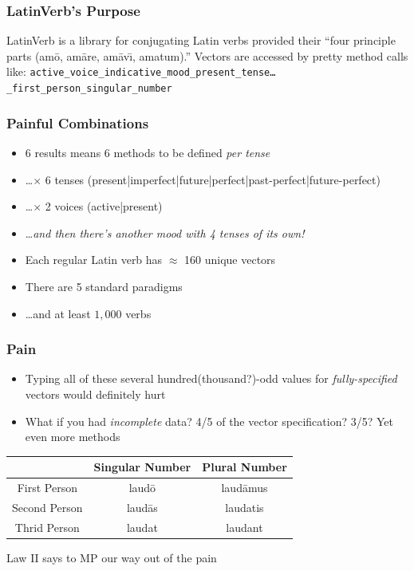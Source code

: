 \documentclass[slidestop,compress,mathserif]{beamer}
\begin{document}
\begin{frame}
	\frametitle{LatinVerb's Purpose}
	LatinVerb is a library for conjugating Latin verbs provided their ``four principle parts (am\={o}, am\={a}re, am\={a}v\={\i}, amatum).''
	\pause
	\vskip 0.5cm
	Vectors are accessed by pretty method calls like: \texttt{active\_voice\_indicative\_mood\_present\_tense{\ldots}\\\_first\_person\_singular\_number}
\end{frame}

\begin{frame}
	\frametitle{Painful Combinations}
	\begin{itemize}
		\item 6 results means 6 methods to be defined \emph{per tense}
		\pause
		\item \ldots $\times$ 6 tenses (present|imperfect|future|perfect|past-perfect|future-perfect)
		\pause
		\item \ldots $\times$ 2 voices (active|present)
		\pause
		\item \ldots \emph{and then there's another mood with 4 tenses of its own!}
		\pause
		\item Each regular Latin verb has $\approx$  160 unique vectors
		\pause
		\item There are 5 standard paradigms
		\pause
		\item \ldots and at least $1,000$ verbs
	\end{itemize}
\end{frame}

\begin{frame}
		\frametitle{Pain}
		\begin{itemize}
			\item Typing all of these several hundred(thousand?)-odd values for \emph{fully-specified} vectors would definitely hurt
			\pause
			\item What if you had \emph{incomplete} data?  4/5 of the vector specification?  3/5?  Yet even more methods
		\end{itemize}
		\begin{center}
			\begin{tabular}{|c|c|c|}
				\hline
				  & Singular Number &  Plural Number\\
				\hline
				First Person  & laud\={o}  & laud\={a}mus\\
				Second Person & laud\={a}s & laudatis \\
				Thrid Person  & laudat     & laudant \\
				\hline
			\end{tabular}
		\end{center}
		\pause
		Law II says to MP our way out of the pain
\end{frame}
\end{document}
